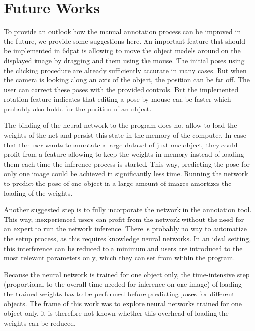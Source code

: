 \chapter{Future Works} \label{chapter:future_work}

To provide an outlook how the manual annotation process can be improved in the future, we provide some suggestions here. An important feature that should be implemented in \ac{6dpat} is allowing to move the object models around on the displayed image by dragging and them using the mouse. The initial poses using the clicking procedure are already sufficiently accurate in many cases. But when the camera is looking along an axis of the object, the position can be far off. The user can correct these poses with the provided controls. But the implemented rotation feature indicates that editing a pose by mouse can be faster which probably also holds for the position of an object.

The binding of the neural network to the program does not allow to load the weights of the net and persist this state in the memory of the computer. In case that the user wants to annotate a large dataset of just one object, they could profit from a feature allowing to keep the weights in memory instead of loading them each time the inference process is started. This way, predicting the pose for only one image could be achieved in significantly less time. Running the network to predict the pose of one object in a large amount of images amortizes the loading of the weights.

Another suggested step is to fully incorporate the network in the annotation tool. This way, inexperienced users can profit from the network without the need for an expert to run the network inference. There is probably no way to automatize the setup process, as this requires knowledge neural networks. In an ideal setting, this interference can be reduced to a minimum and users are introduced to the most relevant parameters only, which they can set from within the program.

Because the neural network is trained for one object only, the time-intensive step (proportional to the overall time needed for inference on one image) of loading the trained weights has to be performed before predicting poses for different objects. The frame of this work was to explore neural networks trained for one object only, it is therefore not known whether this overhead of loading the weights can be reduced.



